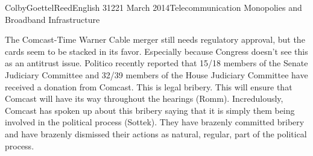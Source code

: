 \documentclass[12pt]{article}
\begin{document}
\begin{mla}{Colby}{Goettel}{Reed}{English 312}{21 March 2014}{Telecommunication Monopolies and Broadband Infrastructure}
\begin{figure}
\end{figure}

The Comcast-Time Warner Cable merger still needs regulatory approval, but the cards seem to be stacked in its favor. Especially because Congress doesn't see this as an antitrust issue. Politico recently reported that 15/18 members of the Senate Judiciary Committee and 32/39 members of the House Judiciary Committee have received a donation from Comcast. This is legal bribery. This will ensure that Comcast will have its way throughout the hearings (Romm). Incredulously, Comcast has spoken up about this bribery saying that it is simply them being involved in the political process (Sottek). They have brazenly committed bribery and have brazenly dismissed their actions as natural, regular, part of the political process.


\end{mla}
\end{document}
